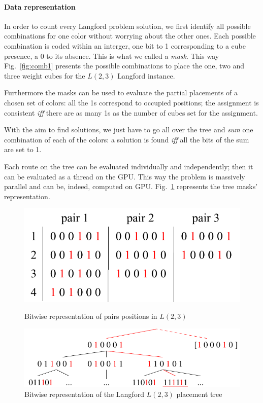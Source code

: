 \paragraph{Data representation}

In order to count every Langford problem solution, we first identify all possible combinations for one color without worrying about the other ones. 
Each possible combination is coded within an interger, one bit to 1 corresponding to a cube presence, a 0 to its absence. This is what we called a \emph{mask}.
This way Fig.~\ref{fig:comb1} presents the possible combinations to place the one, two and three weight cubes for the $L(2,3)$ Langford instance.

Furthermore the masks can be used to evaluate the partial placements of a chosen set of colors: all the 1s correspond to occupied positions; the assignment is consistent \emph{iff} there are as many 1s as the number of cubes set for the assignment. 

With the aim to find solutions, we just have to go all over the tree and \emph{sum} one combination of each of the colors: a solution is found \emph{iff} all the bits of the sum are set to 1. 

Each route on the tree can be evaluated individually and independently; then it can be evaluated as a thread on the GPU.
This way the problem is massively parallel and can be, indeed, computed on GPU. Fig.~\ref{fig:pos_lgf} represents the tree masks' representation.

\begin{figure}[htb]
\begin{minipage}[b]{0.40\linewidth}
\centering
\includegraphics[width=\columnwidth]{figures/langford/positions_lgf}
\caption{ Bitwise representation of pairs positions in $L(2,3)$} \label{fig:comb1}
\end{minipage}
\hfill
\begin{minipage}[b]{0.55\linewidth}
\centering
\includegraphics[width=\columnwidth]{figures/langford/pos_lgf_v2}
\caption{Bitwise representation of the Langford $L(2,3)$ placement tree}\label{fig:pos_lgf}
\end{minipage}
\end{figure}

